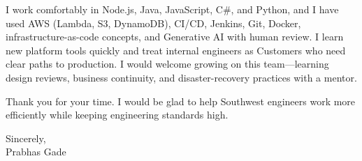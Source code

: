 \documentclass[letterpaper,11pt]{letter}
\begin{document}
I work comfortably in Node.js, Java, JavaScript, C\#, and Python, and I have used AWS (Lambda, S3, DynamoDB), CI/CD, Jenkins, Git, Docker, infrastructure-as-code concepts, and Generative AI with human review. I learn new platform tools quickly and treat internal engineers as Customers who need clear paths to production. I would welcome growing on this team---learning design reviews, business continuity, and disaster-recovery practices with a mentor.

Thank you for your time. I would be glad to help Southwest engineers work more efficiently while keeping engineering standards high.

Sincerely,\\
Prabhas Gade
\end{document}
